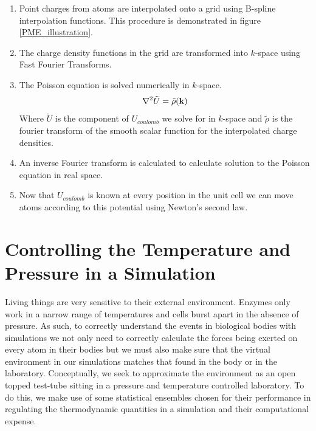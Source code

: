 \begin{enumerate}
	\item Point charges from atoms are interpolated onto a grid using B-spline interpolation functions. This procedure is demonstrated in figure \ref{PME_illustration}.
	\item The charge density functions in the grid are transformed into $k$-space using Fast Fourier Transforms.
	\item The Poisson equation is solved numerically in $k$-space.
		\begin{equation}	
			\nabla^2\tilde{U} = \tilde{\rho}(\bold{k})
		\end{equation}	
		Where $\tilde{U}$ is the component of $U_{coulomb}$ we solve for in $k$-space and $\tilde{\rho}$ is the fourier transform of the smooth scalar function for the interpolated charge densities. 
	\item An inverse Fourier transform is calculated to calculate solution to the Poisson equation in real space. 
	\item Now that $U_{coulomb}$ is known at every position in the unit cell we can move atoms according to this potential using Newton's second law.
\end{enumerate}

%
%
%

\section{Controlling the Temperature and Pressure in a Simulation}
Living things are very sensitive to their external environment. Enzymes only work in a narrow range of temperatures and cells burst apart in the absence of pressure. As such, to correctly understand the events in biological bodies with simulations we not only need to correctly calculate the forces being exerted on every atom in their bodies but we must also make sure that the virtual environment in our simulations matches that found in the body or in the laboratory. Conceptually, we seek to approximate the environment as an open topped test-tube sitting in a pressure and temperature controlled laboratory. To do this, we make use of some statistical ensembles chosen for their performance in regulating the thermodynamic quantities in a simulation and their computational expense.  

